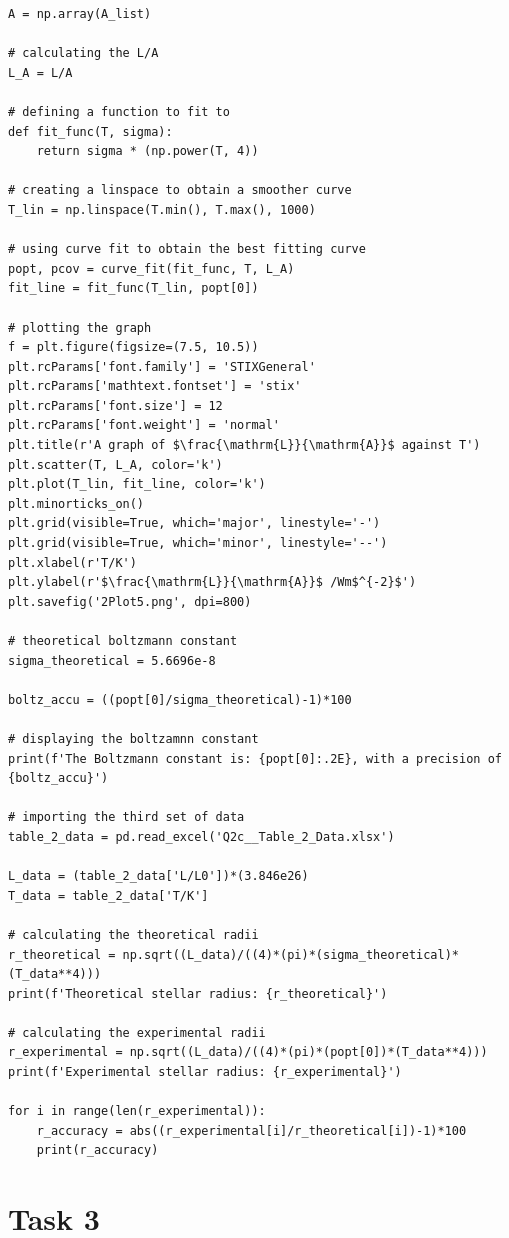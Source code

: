 \documentclass[12pt, a4paper]{article}
\begin{document}
\begin{verbatim}
A = np.array(A_list)

# calculating the L/A
L_A = L/A

# defining a function to fit to
def fit_func(T, sigma):
    return sigma * (np.power(T, 4))

# creating a linspace to obtain a smoother curve
T_lin = np.linspace(T.min(), T.max(), 1000)

# using curve fit to obtain the best fitting curve
popt, pcov = curve_fit(fit_func, T, L_A)
fit_line = fit_func(T_lin, popt[0])

# plotting the graph
f = plt.figure(figsize=(7.5, 10.5))
plt.rcParams['font.family'] = 'STIXGeneral'
plt.rcParams['mathtext.fontset'] = 'stix'
plt.rcParams['font.size'] = 12
plt.rcParams['font.weight'] = 'normal'
plt.title(r'A graph of $\frac{\mathrm{L}}{\mathrm{A}}$ against T')
plt.scatter(T, L_A, color='k')
plt.plot(T_lin, fit_line, color='k')
plt.minorticks_on()
plt.grid(visible=True, which='major', linestyle='-')
plt.grid(visible=True, which='minor', linestyle='--')
plt.xlabel(r'T/K')
plt.ylabel(r'$\frac{\mathrm{L}}{\mathrm{A}}$ /Wm$^{-2}$')
plt.savefig('2Plot5.png', dpi=800)

# theoretical boltzmann constant
sigma_theoretical = 5.6696e-8 

boltz_accu = ((popt[0]/sigma_theoretical)-1)*100

# displaying the boltzamnn constant
print(f'The Boltzmann constant is: {popt[0]:.2E}, with a precision of {boltz_accu}')

# importing the third set of data
table_2_data = pd.read_excel('Q2c__Table_2_Data.xlsx')

L_data = (table_2_data['L/L0'])*(3.846e26)    
T_data = table_2_data['T/K']                              

# calculating the theoretical radii
r_theoretical = np.sqrt((L_data)/((4)*(pi)*(sigma_theoretical)*(T_data**4)))
print(f'Theoretical stellar radius: {r_theoretical}')

# calculating the experimental radii
r_experimental = np.sqrt((L_data)/((4)*(pi)*(popt[0])*(T_data**4)))
print(f'Experimental stellar radius: {r_experimental}')

for i in range(len(r_experimental)):
    r_accuracy = abs((r_experimental[i]/r_theoretical[i])-1)*100
    print(r_accuracy)

\end{verbatim}

\section{Task 3}
\end{document}

